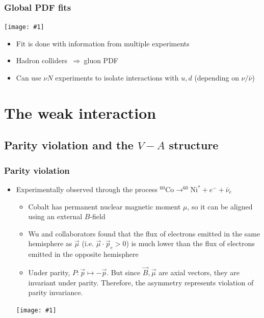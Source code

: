 \documentclass[11pt]{article}
\newcommand{\nubar}{{\bar{\nu}}}
\newcommand{\el}{\ensuremath{e^{-}}\xspace}
\newcommand{\thus}{\ensuremath{~\Rightarrow~}}
\newcommand{\embedimgw}[2]{\begin{center}\texttt{[image: \#1]}\end{center}}
\begin{document}
\subsubsection{Global PDF fits}
\embedimgw{figs/pdf_global.png}{.5}
\begin{itemize}
  \item Fit is done with information from multiple experiments
  \item Hadron colliders \thus gluon PDF
  \item Can use $\nu N$ experiments to isolate interactions with $u,d$ (depending on $\nu/\nubar$)
\end{itemize}

\section{The weak interaction}
\subsection{Parity violation and the $V-A$ structure}
\subsubsection{Parity violation}
\begin{itemize}
  \item Experimentally observed through the process $^{60}\text{Co}\rightarrow^{60}\text{Ni}^* + \el + \nubar_e$
  \begin{itemize}
    \item Cobalt has permanent nuclear magnetic moment $\mu$, so it can be aligned using an external $B$-field
    \item Wu and collaborators found that the flux of electrons emitted in the same hemisphere as $\vec\mu$ (i.e. $\vec\mu\cdot \vec p_e>0$) is much lower than the flux of electrons emitted in the opposite hemisphere
    \item Under parity, $P:\vec p \mapsto - \vec p$. But since $\vec B,\vec \mu$ are axial vectors, they are invariant under parity. Therefore, the asymmetry represents violation of parity invariance.
  \end{itemize}
  \embedimgw{figs/wu.png}{.4}
\end{itemize}
\end{document}
